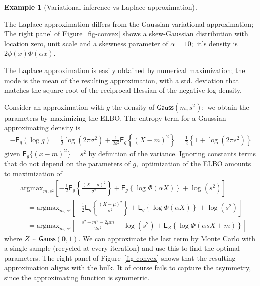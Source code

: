 \documentclass[
  11pt,
  letterpaper,
]{scrbook}
\theoremstyle{definition}
\theoremstyle{plain}
\theoremstyle{plain}
\theoremstyle{plain}
\theoremstyle{definition}
\newtheorem{example}{Example}[chapter]
\theoremstyle{definition}
\theoremstyle{remark}
\begin{document}
\begin{example}[Variational inference vs Laplace
approximation]\protect\hypertarget{exm-varional-vs-laplace}{}\label{exm-varional-vs-laplace}

The Laplace approximation differs from the Gaussian variational
approximation; The right panel of Figure~\ref{fig-convex} shows a
skew-Gaussian distribution with location zero, unit scale and a skewness
parameter of \(\alpha=10;\) it's density is \(2\phi(x)\Phi(\alpha x).\)

The Laplace approximation is easily obtained by numerical maximization;
the mode is the mean of the resulting approximation, with a std.
deviation that matches the square root of the reciprocal Hessian of the
negative log density.

Consider an approximation with \(g\) the density of
\(\mathsf{Gauss}(m, s^2);\) we obtain the parameters by maximizing the
ELBO. The entropy term for a Gaussian approximating density is
\begin{align*}
-\mathsf{E}_g(\log g) = \frac{1}{2}\log(2\pi \sigma^2) + \frac{1}{2s^2}\mathsf{E}_g\left\{(X-m)^2 \right\} = \frac{1}{2} \left\{1+\log(2\pi s^2)\right\}
\end{align*} given \(\mathsf{E}_g\{(x-m)^2\}=s^2\) by definition of the
variance. Ignoring constants terms that do not depend on the parameters
of \(g,\) optimization of the ELBO amounts to maximization of
\begin{align*}
&\mathrm{argmax}_{m, s^2} \left[-\frac{1}{2} \mathsf{E}_g \left\{ \frac{(X-\mu)^2}{\sigma^2}\right\} + \mathsf{E}_g\left\{\log \Phi(\alpha X)\right\} + \log(s^2) \right] \\
&\quad =\mathrm{argmax}_{m, s^2} \left[ -\frac{1}{2} \mathsf{E}_g \left\{ \frac{(X-\mu)^2}{\sigma^2}\right\} + \mathsf{E}_g\left\{\log \Phi(\alpha X)\right\} + \log(s^2) \right]
\\&\quad =\mathrm{argmax}_{m, s^2} \left[ -\frac{s^2 + m^2 -2\mu m}{2\sigma^2} + \log(s^2) + \mathsf{E}_{Z}\left\{\log \Phi(\alpha sX+m)\right\} \right]
\end{align*} where \(Z \sim \mathsf{Gauss}(0,1).\) We can approximate
the last term by Monte Carlo with a single sample (recycled at every
iteration) and use this to find the optimal parameters. The right panel
of Figure~\ref{fig-convex} shows that the resulting approximation aligns
with the bulk. It of course fails to capture the asymmetry, since the
approximating function is symmetric.

\end{example}
\end{document}
